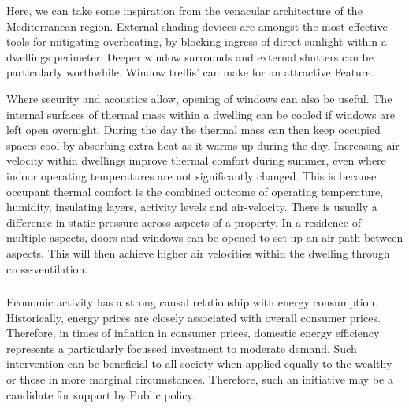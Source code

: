 \documentclass[11pt, oneside]{book}   	%
\begin{document}
Here, we can take some inspiration from the venacular architecture of the Mediterranean region.
External shading devices are amongst the most effective tools for mitigating overheating, by blocking ingress of direct sunlight within a dwellings perimeter.
Deeper window surrounds and external shutters can be particularly worthwhile.
Window trellis' can make for an attractive Feature.\

Where security and acoustics allow, opening of windows can also be useful.
The internal surfaces of thermal mass within a dwelling can be cooled if windows are left open overnight.
During the day the thermal mass can then keep occupied spaces cool by absorbing extra heat as it warms up during the day.
Increasing air-velocity within dwellings improve thermal comfort during summer, even where indoor operating temperatures are not significantly changed.
This is because occupant thermal comfort is the combined outcome of operating temperature, humidity, insulating layers, activity levels and air-velocity.
There is usually a difference in static pressure across aspects of a property.
In a residence of multiple aspects, doors and windows can be opened to set up an air path between aspects.
This will then achieve higher air velocities within the dwelling through cross-ventilation.\

\subsubsection{\color{YellowOrange}{P2: Close Control of Domestic Heating}}
Economic activity has a strong causal relationship with energy consumption.
Historically, energy prices are closely associated with overall consumer prices.
Therefore, in times of inflation in consumer prices, domestic energy efficiency represents a particularly focussed investment to moderate demand.
Such intervention can be beneficial to all society when applied equally to the wealthy or those in more marginal circumstances.
Therefore, such an initiative may be a candidate for support by Public policy.\
\end{document}
